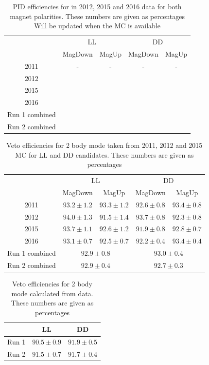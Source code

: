 \begin{table}[h]
\centering
\begin{tabular}{c|cc|cc}
\hline
& \multicolumn{2}{c}{LL} & \multicolumn{2}{c}{DD} \\
& MagDown & MagUp & MagDown & MagUp \\
\hline
2011 & - & - & - & - \\
2012 & & & & \\
2015 &  &  &  &  \\
2016 & & & & \\
\hline
Run 1 combined & \multicolumn{2}{c}{} & \multicolumn{2}{c}{} \\
Run 2 combined & \multicolumn{2}{c}{} & \multicolumn{2}{c}{} \\
\hline
\end{tabular}
\caption{PID efficiencies for \decay{\Dz}{\pip\pim\pip\pim} in 2012, 2015 and 2016 data for both magnet polarities. These numbers are given as percentages {\color{red} Will be updated when the MC is available}}
\label{pideffpipipipi}
\end{table}

\begin{table}
\centering
\begin{tabular}{c|cc|cc}
\hline
& \multicolumn{2}{c}{LL} & \multicolumn{2}{c}{DD} \\
& MagDown & MagUp & MagDown & MagUp \\
\hline
2011 & $93.2 \pm 1.2$ & $93.3 \pm 1.2$ & $92.6 \pm 0.8$ & $93.4 \pm 0.8$ \\
2012 & $94.0 \pm 1.3$ & $91.5 \pm 1.4$ & $93.7 \pm 0.8$ & $92.3 \pm 0.8$ \\
2015 & $93.7 \pm 1.1$ & $92.6 \pm 1.2$ & $91.9 \pm 0.8$ & $92.8 \pm 0.7$ \\
2016 & $93.1 \pm 0.7$ & $92.5 \pm 0.7$ & $92.2 \pm 0.4$ & $93.4 \pm 0.4$ \\
\hline
Run 1 combined & \multicolumn{2}{c}{$92.9 \pm 0.8$} & \multicolumn{2}{c}{$93.0 \pm 0.4$} \\
Run 2 combined & \multicolumn{2}{c}{$92.9 \pm 0.4$} & \multicolumn{2}{c}{$92.7 \pm 0.3$} \\
\hline
\end{tabular}
\caption{Veto efficiencies for 2 body mode taken from 2011, 2012 and 2015 MC for LL and DD candidates. These numbers are given as percentages}
\label{vetoefficiencies}
\end{table}

\begin{table}
\centering
\begin{tabular}{ccc}
\hline
& LL & DD \\
\hline
Run 1 & $90.5 \pm 0.9$ & $91.9 \pm 0.5$ \\
Run 2 & $91.5 \pm 0.7$ & $91.7 \pm 0.4$ \\
\hline
\end{tabular}
\caption{Veto efficiencies for 2 body mode calculated from data. These numbers are given as percentages}
\label{vetoefficienciesdata}
\end{table}

